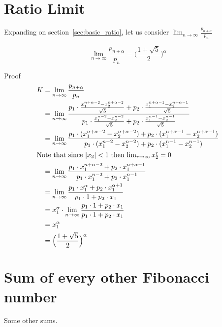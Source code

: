 \documentclass[a4paper]{article}
\begin{document}
\section{Ratio Limit}\label{sec:ratio-limit}
Expanding on section~\ref{sec:basic_ratio}, let us consider $\lim_{n \to \infty} \frac{p_{n+\alpha}}{p_n}$

\begin{theorem}
\[
\lim_{n \to \infty} \frac{p_{n+\alpha}}{p_n} = \Big(\frac{1+\sqrt{5}}{2}\Big)^{\alpha}
\]

Proof
\begin{gather*}
\begin{split}
K &= \lim_{n \to \infty} \frac{p_{n+\alpha}}{p_n} \\
    &= \lim_{n \to \infty} \frac{
p_1 \cdot \frac{x_1^{n+ \alpha -2} - x_2^{n+\alpha -2}}{\sqrt{5}} + p_2 \cdot \frac{x_1^{n+\alpha-1} - x_2^{n+\alpha-1}}{\sqrt{5}}
    }{
p_1 \cdot \frac{x_1^{n-2} - x_2^{n -2}}{\sqrt{5}} + p_2 \cdot \frac{x_1^{n-1} - x_2^{n-1}}{\sqrt{5}}
    } \\
    &= \lim_{n \to \infty} \frac{
p_1 \cdot (x_1^{n+ \alpha -2} - x_2^{n+\alpha -2} ) + p_2 \cdot (x_1^{n+\alpha-1} - x_2^{n+\alpha-1})
    }{
p_1 \cdot (x_1^{n-2} - x_2^{n -2}) + p_2 \cdot (x_1^{n-1} - x_2^{n-1})
    }\\
\shortintertext{Note that since $|x_2| <1$ then $\lim_{r \to \infty} x_2^r = 0$ }
    &= \lim_{n \to \infty} \frac{
p_1 \cdot x_1^{n+ \alpha -2} + p_2 \cdot x_1^{n+\alpha-1}
    }{
p_1 \cdot x_1^{n-2} + p_2 \cdot x_1^{n-1}
    } \\
    &= \lim_{n \to \infty} \frac{
p_1 \cdot x_1^{\alpha} + p_2 \cdot x_1^{\alpha+1}
    }{
p_1 \cdot 1 + p_2 \cdot x_1
    } \\
    &= x_1^{\alpha} \cdot \lim_{n \to \infty} \frac{
p_1 \cdot 1 + p_2 \cdot x_1
    }{
p_1 \cdot 1 + p_2 \cdot x_1
    } \\
    &=  x_1^{\alpha} \\
    &= \Big(\frac{1+\sqrt{5}}{2}\Big)^{\alpha} \\
\end{split}\\
\end{gather*}
\end{theorem}


\section{Sum of every other Fibonacci number}\label{sec:sum-of-every-other-fibonacci-number}
Some other sums.
\end{document}

